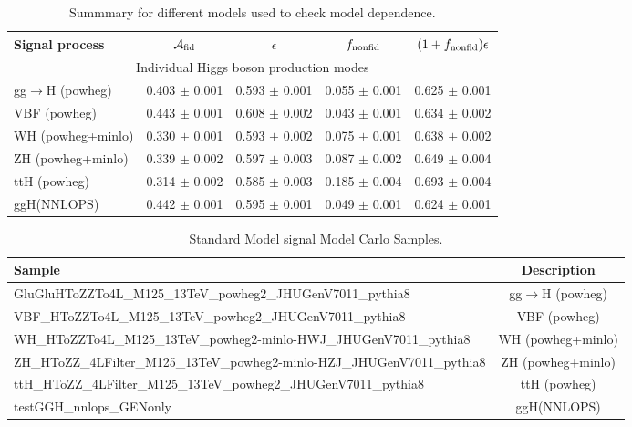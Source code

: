 \begin{table}[!h!tb]
\begin{center}
\small
\caption{
Summmary for different models used to check model dependence.
\label{tab:summaryExo}
}
\begin{tabular}{|l|c|c|c|c|} \hline \hline 
\textbf{Signal process} & $\mathcal{A}_{\rm fid}$ & $\epsilon$ & $f_{\rm nonfid}$  & $(1+f_{\rm nonfid})\epsilon$ \\ \hline \hline 
\multicolumn{5}{|c|}{Individual Higgs boson production modes} \\ \hline 
gg$\rightarrow$H ({\sc powheg})  & 0.403 $\pm$ 0.001 & 0.593 $\pm$ 0.001 & 0.055 $\pm$ 0.001 & 0.625 $\pm$ 0.001 \\ 
 VBF ({\sc powheg})  & 0.443 $\pm$ 0.001 & 0.608 $\pm$ 0.002 & 0.043 $\pm$ 0.001 & 0.634 $\pm$ 0.002 \\ 
 WH ({\sc powheg+minlo}) & 0.330 $\pm$ 0.001 & 0.593 $\pm$ 0.002 & 0.075 $\pm$ 0.001 & 0.638 $\pm$ 0.002 \\ 
 ZH ({\sc powheg+minlo})  & 0.339 $\pm$ 0.002 & 0.597 $\pm$ 0.003 & 0.087 $\pm$ 0.002 & 0.649 $\pm$ 0.004 \\ 
 ttH ({\sc powheg}) & 0.314 $\pm$ 0.002 & 0.585 $\pm$ 0.003 & 0.185 $\pm$ 0.004 & 0.693 $\pm$ 0.004 \\ 
 ggH(NNLOPS) & 0.442 $\pm$ 0.001 & 0.595 $\pm$ 0.001 & 0.049 $\pm$ 0.001 & 0.624 $\pm$ 0.001 \\ 
 
\hline \hline
\end{tabular}
\normalsize
\end{center}
\end{table}
 
 
 
\begin{table}[!h!tb]
\begin{center}
\small
\caption{
Standard Model signal Model Carlo Samples.
\label{tab:samplesSM}
}
\begin{tabular}{|l|c|} \hline 
Sample & Description \\ \hline 
GluGluHToZZTo4L\_M125\_13TeV\_powheg2\_JHUGenV7011\_pythia8 & gg$\rightarrow$H ({\sc powheg})  \\ 
 VBF\_HToZZTo4L\_M125\_13TeV\_powheg2\_JHUGenV7011\_pythia8 & VBF ({\sc powheg})  \\ 
 WH\_HToZZTo4L\_M125\_13TeV\_powheg2-minlo-HWJ\_JHUGenV7011\_pythia8 & WH ({\sc powheg+minlo}) \\ 
 ZH\_HToZZ\_4LFilter\_M125\_13TeV\_powheg2-minlo-HZJ\_JHUGenV7011\_pythia8 & ZH ({\sc powheg+minlo})  \\ 
 ttH\_HToZZ\_4LFilter\_M125\_13TeV\_powheg2\_JHUGenV7011\_pythia8 & ttH ({\sc powheg}) \\ 
 testGGH\_nnlops\_GENonly & ggH(NNLOPS) \\ 
 
\hline
\end{tabular}
\normalsize
\end{center}
\end{table}
 
